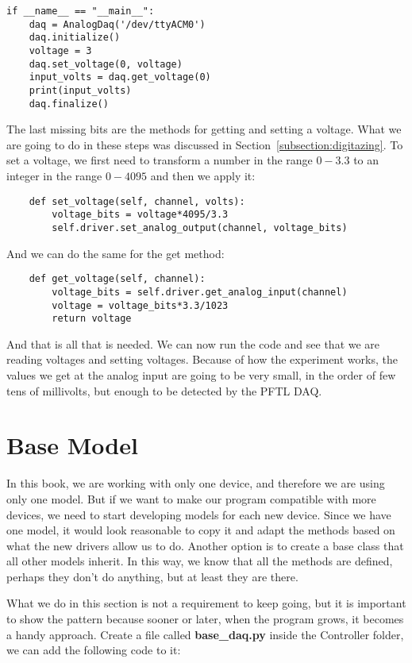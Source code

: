 \begin{verbatim}
if __name__ == "__main__":
    daq = AnalogDaq('/dev/ttyACM0')
    daq.initialize()
    voltage = 3
    daq.set_voltage(0, voltage)
    input_volts = daq.get_voltage(0)
    print(input_volts)
    daq.finalize()
\end{verbatim}

The last missing bits are the methods for getting and setting a voltage. What we are going to do in these steps was discussed in Section~\ref{subsection:digitazing}. To set a voltage, we first need to transform a number in the range $0-3.3$ to an integer in the range $0-4095$ and then we apply it:

\begin{verbatim}
    def set_voltage(self, channel, volts):
        voltage_bits = voltage*4095/3.3
        self.driver.set_analog_output(channel, voltage_bits)
\end{verbatim}

And we can do the same for the get method:

\begin{verbatim}
    def get_voltage(self, channel):
        voltage_bits = self.driver.get_analog_input(channel)
        voltage = voltage_bits*3.3/1023
        return voltage
\end{verbatim}

And that is all that is needed. We can now run the code and see that we are reading voltages and setting voltages. Because of how the experiment works, the values we get at the analog input are going to be very small, in the order of few tens of millivolts, but enough to be detected by the {PFTL DAQ}.

\section{Base Model}\label{sec:base-model}
In this book, we are working with only one device, and therefore we are using only one model. But if we want to make our program compatible with more devices, we need to start developing models for each new device. Since we have one model, it would look reasonable to copy it and adapt the methods based on what the new drivers allow us to do. Another option is to create a base class that all other models inherit. In this way, we know that all the methods are defined, perhaps they don't do anything, but at least they are there.

What we do in this section is not a requirement to keep going, but it is important to show the pattern because sooner or later, when the program grows, it becomes a handy approach. Create a file called \textbf{base\_daq.py} inside the Controller folder, we can add the following code to it:

